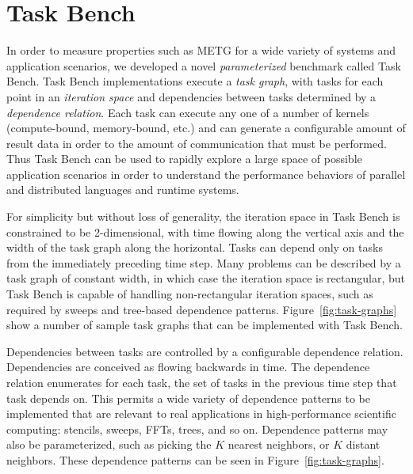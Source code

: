 \section{Task Bench}
\label{sec:task-bench}

In order to measure properties such as METG for a wide variety of
systems and application scenarios, we developed a novel
\emph{parameterized} benchmark called Task Bench. Task Bench
implementations execute a \emph{task graph}, with tasks for each point
in an \emph{iteration space} and dependencies between tasks determined
by a \emph{dependence relation}. Each task can execute any one of a
number of kernels (compute-bound, memory-bound, etc.) and can generate
a configurable amount of result data in order to the amount of
communication that must be performed. Thus Task Bench can be used to
rapidly explore a large space of possible application scenarios in
order to understand the performance behaviors of parallel and
distributed languages and runtime systems.

For simplicity but without loss of generality, the iteration space in
Task Bench is constrained to be 2-dimensional, with time flowing along
the vertical axis and the width of the task graph along the
horizontal. Tasks can depend only on tasks from the immediately
preceding time step. Many problems can be described by a task graph of
constant width, in which case the iteration space is rectangular, but
Task Bench is capable of handling non-rectangular iteration spaces,
such as required by sweeps and tree-based dependence
patterns. Figure~\ref{fig:task-graphs} show a number of sample task
graphs that can be implemented with Task Bench.


Dependencies between tasks are controlled by a configurable dependence
relation. Dependencies are conceived as flowing backwards in time. The
dependence relation enumerates for each task, the set of tasks in the
previous time step that task depends on. This permits a wide variety
of dependence patterns to be implemented that are relevant to real
applications in high-performance scientific computing: stencils,
sweeps, FFTs, trees, and so on. Dependence patterns may also be
parameterized, such as picking the $K$ nearest neighbors, or $K$
distant neighbors. These dependence patterns can be seen in
Figure~\ref{fig:task-graphs}.

